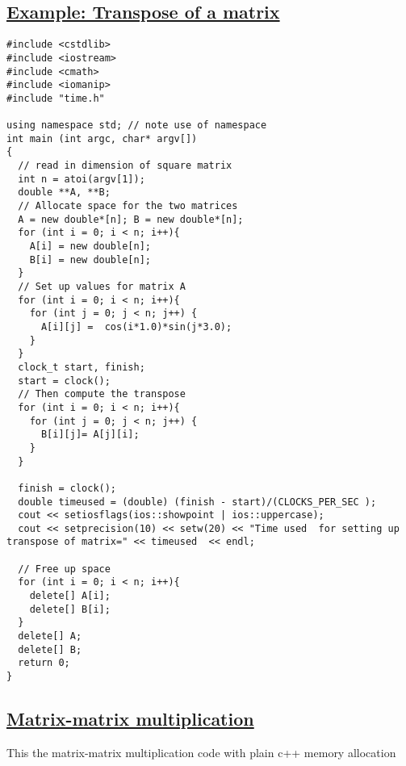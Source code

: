 \documentclass[%
oneside,                 %
final,                   %
10pt]{article}
\begin{document}
\subsection*{\href{{https://github.com/CompPhysics/ComputationalPhysicsMSU/blob/master/doc/Programs/LecturePrograms/programs/Classes/cpp/program8.cpp}}{Example: Transpose of a matrix}}

\begin{Verbatim}[numbers=none,fontsize=\fontsize{9pt}{9pt},baselinestretch=0.95]
#include <cstdlib>
#include <iostream>
#include <cmath>
#include <iomanip>
#include "time.h"

using namespace std; // note use of namespace
int main (int argc, char* argv[])
{
  // read in dimension of square matrix
  int n = atoi(argv[1]);
  double **A, **B;
  // Allocate space for the two matrices
  A = new double*[n]; B = new double*[n];
  for (int i = 0; i < n; i++){
    A[i] = new double[n];
    B[i] = new double[n];
  }
  // Set up values for matrix A
  for (int i = 0; i < n; i++){
    for (int j = 0; j < n; j++) {
      A[i][j] =  cos(i*1.0)*sin(j*3.0);
    }
  }
  clock_t start, finish;
  start = clock();
  // Then compute the transpose
  for (int i = 0; i < n; i++){
    for (int j = 0; j < n; j++) {
      B[i][j]= A[j][i];
    }
  }

  finish = clock();
  double timeused = (double) (finish - start)/(CLOCKS_PER_SEC );
  cout << setiosflags(ios::showpoint | ios::uppercase);
  cout << setprecision(10) << setw(20) << "Time used  for setting up transpose of matrix=" << timeused  << endl;

  // Free up space
  for (int i = 0; i < n; i++){
    delete[] A[i];
    delete[] B[i];
  }
  delete[] A;
  delete[] B;
  return 0;
}

\end{Verbatim}


\subsection*{\href{{https://github.com/CompPhysics/ComputationalPhysicsMSU/blob/master/doc/Programs/LecturePrograms/programs/Classes/cpp/program9.cpp}}{Matrix-matrix multiplication}}
This the matrix-matrix multiplication code with plain c++ memory allocation
\end{document}
